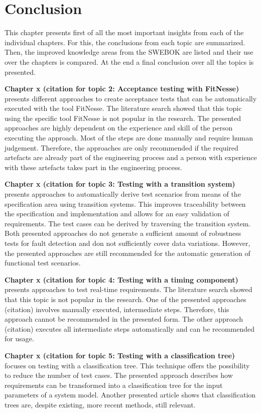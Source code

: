 \chapter{Conclusion} \label{sec:conclusion}

This chapter presents first of all the most important insights from each of the individual chapters. For this, the conclusions from each topic are summarized. Then, the improved knowledge areas from the SWEBOK are listed and their use over the chapters is compared. At the end a final conclusion over all the topics is presented.

\textbf{Chapter x (citation for topic 2: Acceptance testing with FitNesse)} presents different approaches to create acceptance tests that can be automatically executed with the tool FitNesse. The literature search showed that this topic using the specific tool FitNesse is not popular in the research. The presented approaches are highly dependent on the experience and skill of the person executing the approach. Most of the steps are done manually and require human judgement. Therefore, the approaches are only recommended if the required artefacts are already part of the engineering process and a person with experience with these artefacts takes part in the engineering process.

\textbf{Chapter x (citation for topic 3: Testing with a transition system)} presents approaches to automatically derive test scenarios from means of the specification area using transition systems. This improves traceability between the specification and implementation and allows for an easy validation of requirements. The test cases can be derived by traversing the transition system. Both presented approaches do not generate a sufficient amount of robustness tests for fault detection and don not sufficiently cover data variations. However, the presented approaches are still recommended for the automatic generation of functional test scenarios.

\textbf{Chapter x (citation for topic 4: Testing with a timing component)} presents approaches to test real-time requirements. The literature search showed that this topic is not popular in the research. One of the presented approaches (citation) involves manually executed, intermediate steps. Therefore, this approach cannot be recommended in the presented form. The other approach (citation) executes all intermediate steps automatically and can be recommended for usage.

\textbf{Chapter x (citation for topic 5: Testing with a classification tree)} focuses on testing with a classification tree. This technique offers the possibility to reduce the number of test cases. The presented approach describes how requirements can be transformed into a classification tree for the input parameters of a system model. Another presented article shows that classification trees are, despite existing, more recent methods, still relevant.

